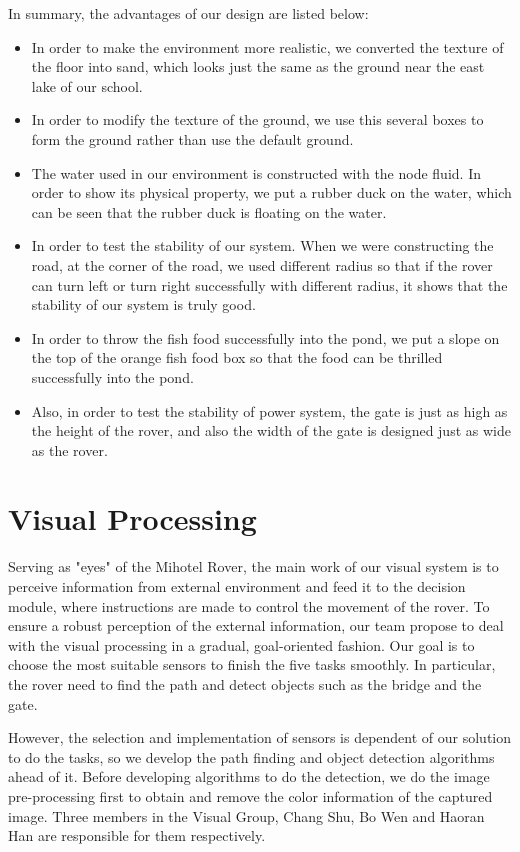 In summary, the advantages of our design are listed below:
\begin{itemize}
    \item In order to make the environment more realistic, we converted the texture of the floor into sand, which looks just the same as the ground near the east lake of our school.
    \item In order to modify the texture of the ground, we use this several boxes to form the ground rather than use the default ground.
    \item The water used in our environment is constructed with the node fluid. In order to show its physical property, we put a rubber duck on the water, which can be seen that the rubber duck is floating on the water.
    \item In order to test the stability of our system. When we were constructing the road, at the corner of the road, we used different radius so that if the rover can turn left or turn right successfully with different radius, it shows that the stability of our system is truly good.
    \item In order to throw the fish food successfully into the pond, we put a slope on the top of the orange fish food box so that the food can be thrilled successfully into the pond.
    \item Also, in order to test the stability of power system, the gate is just as high as the height of the rover, and also the width of the gate is designed just as wide as the rover.
\end{itemize}
\section{Visual Processing\label{sec4.2}}
Serving as "eyes" of the Mihotel Rover, the main work of our visual system is to perceive information from external environment and feed it to the decision module, where instructions are made to control the movement of the rover.  To ensure a robust perception of the external information, our team propose to deal with the visual processing in a gradual, goal-oriented fashion. Our goal is to choose the most suitable sensors to finish the five tasks smoothly. In particular, the rover need to find the path and detect objects such as the bridge and the gate. 

However, the selection and implementation of sensors is dependent of our solution to do the tasks, so we develop the path finding and object detection algorithms ahead of it. Before developing algorithms to do the detection, we do the image pre-processing first to obtain and remove the color information of the captured image. Three members in the Visual Group, Chang Shu, Bo Wen and Haoran Han are responsible for them respectively.
